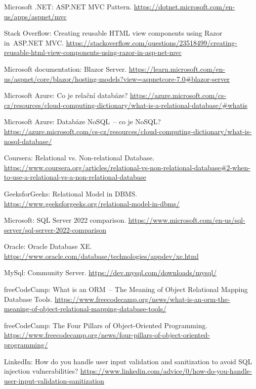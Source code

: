 \begin{thebibliography}{99}
Microsoft .NET: ASP.NET MVC Pattern.
\url{https://dotnet.microsoft.com/en-us/apps/aspnet/mvc}

Stack Overflow: Creating reusable HTML view components using Razor in~ASP.NET MVC.
\url{https://stackoverflow.com/questions/23518499/creating-reusable-html-view-components-using-razor-in-asp-net-mvc}

Microsoft documentation: Blazor Server.
\url{https://learn.microsoft.com/en-us/aspnet/core/blazor/hosting-models?view=aspnetcore-7.0\#blazor-server}

Microsoft Azure: Co je relační databáze?
\url{https://azure.microsoft.com/cs-cz/resources/cloud-computing-dictionary/what-is-a-relational-database/\#whatis}

Microsoft Azure: Databáze NoSQL~-- co je NoSQL?
\url{https://azure.microsoft.com/cs-cz/resources/cloud-computing-dictionary/what-is-nosql-database/}

Coursera: Relational vs. Non-relational Database.
\url{https://www.coursera.org/articles/relational-vs-non-relational-database#2-when-to-use-a-relational-vs-a-non-relational-database}

GeeksforGeeks: Relational Model in DBMS.
\url{https://www.geeksforgeeks.org/relational-model-in-dbms/}

Microsoft: SQL Server 2022 comparison.
\url{https://www.microsoft.com/en-us/sql-server/sql-server-2022-comparison}

Oracle: Oracle Database XE.
\url{https://www.oracle.com/database/technologies/appdev/xe.html}

MySql: Community Server.
\url{https://dev.mysql.com/downloads/mysql/}

freeCodeCamp: What is an ORM~-- The Meaning of Object Relational Mapping Database Tools.
\url{https://www.freecodecamp.org/news/what-is-an-orm-the-meaning-of-object-relational-mapping-database-tools/}

freeCodeCamp: The Four Pillars of Object-Oriented Programming.
\url{https://www.freecodecamp.org/news/four-pillars-of-object-oriented-programming/}

LinkedIn: How do you handle user input validation and sanitization to avoid SQL injection vulnerabilities?
\url{https://www.linkedin.com/advice/0/how-do-you-handle-user-input-validation-sanitization}


\end{thebibliography}
